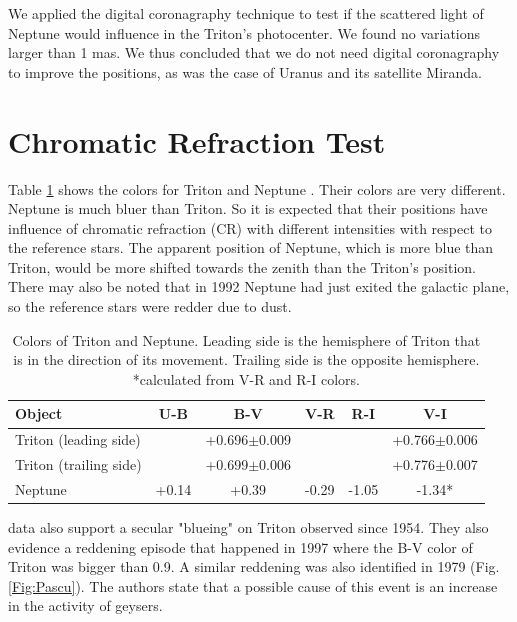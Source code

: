 \documentclass[12pt,a4paper]{report}
\begin{document}
We applied the digital coronagraphy technique to test if the scattered light of Neptune would influence in the Triton's photocenter. We found no variations larger than 1 mas. We thus concluded that we do not need digital coronagraphy to improve the positions, as was the case of Uranus and its satellite Miranda.

\newpage
\section*{Chromatic Refraction Test}

Table \ref{Tab:colors} shows the colors for Triton \citep{Pascu2006} and Neptune \cite{Schmude2016}. Their colors are very different. Neptune is much bluer than Triton. So it is expected that their positions have influence of chromatic refraction (CR) with different intensities with respect to the reference stars. The apparent position of Neptune, which is more blue than Triton, would be more shifted towards the zenith than the Triton's position. There may also be noted that in 1992 Neptune had just exited the galactic plane, so the reference stars were redder due to dust.

\begin{table}[h]
\centering
\begin{tabular}{|l|c|c|c|c|c|}
\hline
Object & U-B & B-V & V-R & R-I & V-I\\
\hline
Triton (leading side) & & +0.696$\pm$0.009 & & & +0.766$\pm$0.006 \\
Triton (trailing side) & & +0.699$\pm$0.006 & & & +0.776$\pm$0.007 \\
Neptune & +0.14 & +0.39 & -0.29 & -1.05 & -1.34*\\
\hline
\end{tabular}
\caption{Colors of Triton and Neptune. Leading side is the hemisphere of Triton that is in the direction of its movement. Trailing side is the opposite hemisphere. \\ *calculated from V-R and R-I colors.}
\label{Tab:colors}
\end{table}

\citep{Pascu2006} data also support a secular "blueing" on Triton observed since 1954. They also evidence a reddening episode that happened in 1997 where the B-V color of Triton was bigger than 0.9. A similar reddening was also identified in 1979 (Fig. \ref{Fig:Pascu}). The authors state that a possible cause of this event is an increase in the activity of geysers.
\end{document}
